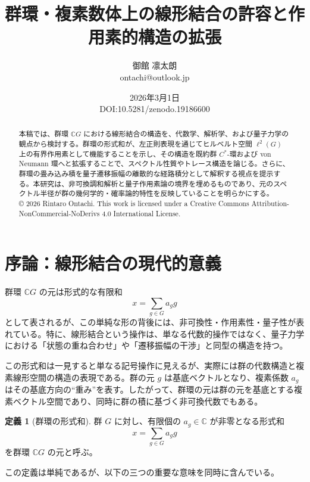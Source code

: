 \documentclass[12pt,a4paper]{ltjarticle}
\theoremstyle{definition}
\newtheorem*{definition}{定義}
\begin{document}
\title{群環・複素数体上の線形結合の許容と作用素的構造の拡張}
\author{御館 凛太朗\\\scriptsize{ontachi@outlook.jp}}
\date{2026年3月1日\\\scriptsize{DOI:10.5281/zenodo.19186600}}
\maketitle
\begin{abstract}
  本稿では、群環 $\mathbb{C}G$ における線形結合の構造を、代数学、解析学、および量子力学の観点から検討する。群環の形式和が、左正則表現を通じてヒルベルト空間 $\ell^2(G)$ 上の有界作用素として機能することを示し、その構造を既約群 $C^*$-環および von Neumann 環へと拡張することで、スペクトル性質やトレース構造を論じる。さらに、群環の畳み込み積を量子遷移振幅の離散的な経路積分として解釈する視点を提示する。本研究は、非可換調和解析と量子作用素論の境界を埋めるものであり、元のスペクトル半径が群の幾何学的・確率論的特性を反映していることを明らかにする。\\\scriptsize{© 2026 Rintaro Ontachi. This work is licensed under a Creative Commons Attribution-NonCommercial-NoDerivs 4.0 International License.}
\end{abstract}
\pagebreak


\section{序論：線形結合の現代的意義}

群環 $\mathbb{C}G$ の元は形式的な有限和
\[
x = \sum_{g \in G} a_g g
\]
として表されるが、この単純な形の背後には、非可換性・作用素性・量子性が表れている。特に、線形結合という操作は、単なる代数的操作ではなく、量子力学における「状態の重ね合わせ」や「遷移振幅の干渉」と同型の構造を持つ。

この形式和は一見すると単なる記号操作に見えるが、実際には群の代数構造と複素線形空間の構造の表現である。群の元 $g$ は基底ベクトルとなり、複素係数 $a_g$ はその基底方向の“重み”を表す。したがって、群環の元は群の元を基底とする複素ベクトル空間であり、同時に群の積に基づく非可換代数でもある。

\begin{definition}[群環の形式和]
群 $G$ に対し、有限個の $a_g\in\mathbb{C}$ が非零となる形式和
\[
x=\sum_{g\in G}a_g g
\]
を群環 $\mathbb{C}G$ の元と呼ぶ。
\end{definition}

この定義は単純であるが、以下の三つの重要な意味を同時に含んでいる。
\end{document}
